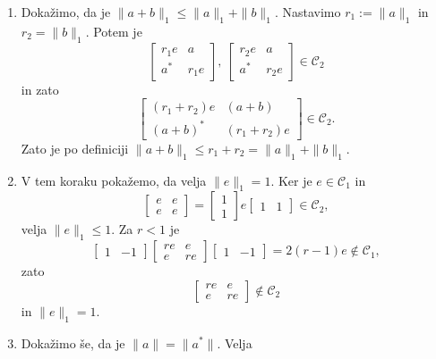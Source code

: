 \begin{dokaz}
\begin{enumerate}
        \item Dokažimo, da je $\| a + b\|_1 \leq \| a\|_1 + \| b\|_1$.
        Nastavimo $r_1 := \| a\|_1$ in $r_2 = \| b\|_1$. Potem je 
        $$\begin{bmatrix}
            r_1 e & a\\
            a^* & r_1 e
        \end{bmatrix}, \ \begin{bmatrix}
            r_2 e & a\\
            a^* & r_2 e
        \end{bmatrix} \in \mathcal{C}_2$$
        in zato
        $$ \begin{bmatrix}
            (r_1 + r_2) e & (a + b)\\
            (a + b)^* & (r_1 + r_2) e
        \end{bmatrix} \in \mathcal{C}_2.$$
        Zato je po definiciji $\| a + b\|_1 \leq r_1 + r_2 = \| a\|_1 + \| b\|_1$.
        \item V tem koraku pokažemo, da velja $\| e\|_1 = 1$. Ker je $e \in \mathcal{C}_1$ in 
        $$\begin{bmatrix}
            e & e\\
             e & e
        \end{bmatrix} = \begin{bmatrix}
            1 \\ 1
        \end{bmatrix} e \begin{bmatrix}
            1 & 1
        \end{bmatrix} \in \mathcal{C}_2,$$
        velja $\| e\|_1 \leq 1$. Za $r < 1$ je 
        $$\begin{bmatrix}
            1 & -1
        \end{bmatrix} \begin{bmatrix}
            re & e\\
             e & re
        \end{bmatrix} \begin{bmatrix}
            1 & -1
        \end{bmatrix} = 2 (r - 1) e \notin \mathcal{C}_1,$$
        zato $$\begin{bmatrix}
            re & e\\
             e & re
        \end{bmatrix} \notin \mathcal{C}_2$$
        in $\| e\|_1 = 1$.
        \item Dokažimo še, da je $\| a\| = \| a^*\|$.
        Velja

\end{enumerate}
\end{dokaz}
